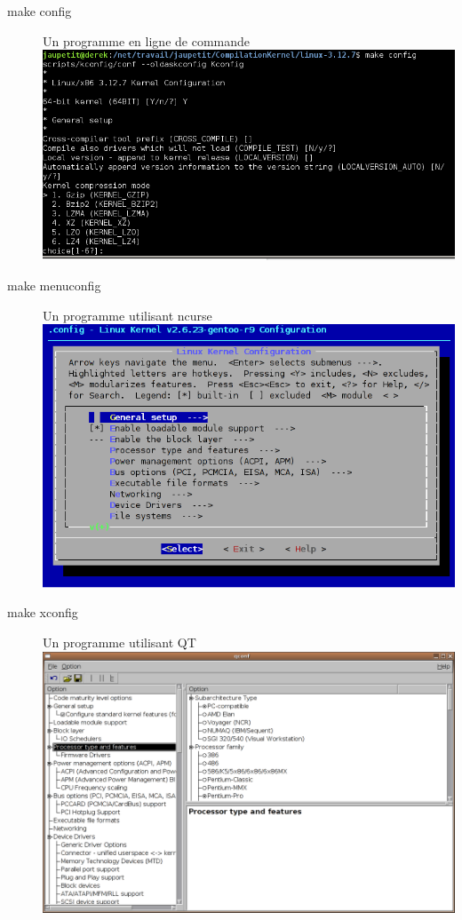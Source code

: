 \documentclass[16pts]{report}
\begin{document}
\begin{description}
    \item[make config]      	Un programme en ligne de commande \\
        \includegraphics[scale=0.7]{illustrations/configLine.png} \pagebreak
    \item[make menuconfig]      Un programme utilisant ncurse \\
        \includegraphics[scale=0.7]{illustrations/menuconfig.png} \\
    \item[make xconfig]     	Un programme utilisant QT \\
        \includegraphics[scale=0.4]{illustrations/xconfig.png} \pagebreak

\end{description}
\end{document}
